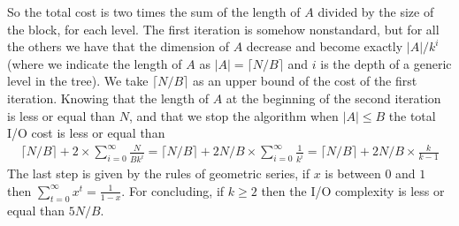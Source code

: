 \documentclass[a4paper]{article}
\newcommand\ceil[1]{\lceil#1\rceil}
\begin{document}
So the total cost is two times the sum of the length of $A$ divided by the size of the block, for each level.
The first iteration is somehow nonstandard, but for all the others we have that the dimension of $A$ decrease and become exactly $|A|/k^i$ (where we indicate the length of $A$ as $|A| = \ceil{N/B} $ and $i$ is the depth of a generic level in the tree).
We take $\ceil{N/B}$ as an upper bound of the cost of the first iteration.
Knowing that the length of $A$ at the beginning of the second iteration is less or equal than $N$, and that we stop the algorithm when $|A| \leq B$ the total I/O cost is less or equal than
\begin{align*}
\ceil{N/B} + 2 \times \sum_{i = 0}^{\infty} \frac{N}{Bk^i} = \ceil{N/B} + 2N/B \times \sum_{i = 0}^{\infty} \frac{1}{k^i} = \ceil{N/B} + 2N/B \times \frac{k}{k - 1}
\end{align*}
The last step is given by the rules of geometric series, if $x$ is between $0$ and $1$ then $\sum_{t = 0}^{\infty} x^t = \frac{1}{1 - x}$.
For concluding, if $k \geq 2$ then the I/O complexity is less or equal than $5N/B$.
\end{document}
